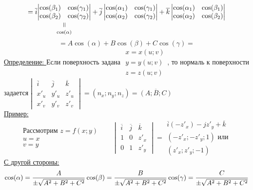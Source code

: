 \documentclass[12pt]{article}
\newcommand{\verteq}{\rotatebox{90}{$\,=$}}
\newcommand{\equalto}[2]{\underset{\scriptstyle\overset{\mkern4mu\verteq}{#2}}{#1}}
\begin{document}
  \[= \overline{i}
  \equalto{
    \begin{vmatrix}
    \cos(\beta_1)&\cos(\gamma_1)\\
    \cos(\beta_2)&\cos(\gamma_2)
    \end{vmatrix}
  }{\cos(\alpha)}+ \overline{j}
  \begin{vmatrix}
    \cos(\alpha_1)&\cos(\gamma_1)\\
    \cos(\alpha_2)&\cos(\gamma_2)
  \end{vmatrix}
  + \overline{k}
  \begin{vmatrix}
    \cos(\alpha_1)&\cos(\beta_1)\\
    \cos(\alpha_2)&\cos(\beta_2)
  \end{vmatrix}
  \]
  \[\boxed{=}A\cos(\alpha)+B\cos(\beta)+C\cos(\gamma)\boxed{=}\]
  \underline{Определение: } Если поверхность задана $\begin{matrix}
    x=x(u;v)\\
    y=y(u;v)\\
    z=z(u;v)
  \end{matrix}$, то нормаль к поверхности задается$\begin{vmatrix}
    \overline{i}&\overline{j}&\overline{k}\\
    x'_u & y'_u & z'_u\\
    x'_v & y'_v & z'_v
  \end{vmatrix}=(n_x;n_y;n_z)=\overline{(A;B;C)}$\\
  \underline{Пример:}\\
  \[\begin{matrix}
    \text{Рассмотрим } z=f(x;y)\\
    u=x\\
    v=y
  \end{matrix}
  \hspace{20pt}
  \begin{vmatrix}
    \overline{i}&\overline{j}&\overline{k}\\
    1&0&z'_x\\
    0&1&z'_y 
  \end{vmatrix}=
  \begin{matrix}
    \overline{i}(-z'_x)-jz'_y+\overline{k}\\
    (-z'_x;-z'_y;1) \text{ или }\\
    (z'_x;z'_y;-1)
  \end{matrix}\]
  \underline{С другой стороны:}
  \[
  \cos(\alpha)=\frac{A}{\pm \sqrt{A^2+B^2+C^2}}\\
  \cos(\beta)=\frac{B}{\pm \sqrt{A^2+B^2+C^2}}\\
  \cos(\gamma)=\frac{C}{\pm \sqrt{A^2+B^2+C^2}}
  \]
\end{document}
